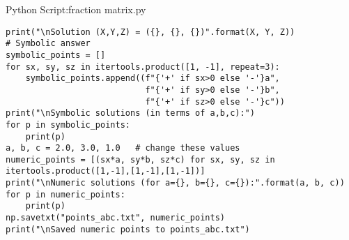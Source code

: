 \documentclass{beamer}
\numberwithin{equation}{section}
\theoremstyle{remark}
\begin{document}
\begin{frame}[fragile]{Python Script:fraction matrix.py}
\begin{verbatim}
print("\nSolution (X,Y,Z) = ({}, {}, {})".format(X, Y, Z))
# Symbolic answer
symbolic_points = []
for sx, sy, sz in itertools.product([1, -1], repeat=3):
    symbolic_points.append((f"{'+' if sx>0 else '-'}a",
                            f"{'+' if sy>0 else '-'}b",
                            f"{'+' if sz>0 else '-'}c"))
print("\nSymbolic solutions (in terms of a,b,c):")
for p in symbolic_points:
    print(p)
a, b, c = 2.0, 3.0, 1.0   # change these values
numeric_points = [(sx*a, sy*b, sz*c) for sx, sy, sz in itertools.product([1,-1],[1,-1],[1,-1])]
print("\nNumeric solutions (for a={}, b={}, c={}):".format(a, b, c))
for p in numeric_points:
    print(p)
np.savetxt("points_abc.txt", numeric_points)
print("\nSaved numeric points to points_abc.txt")
\end{verbatim}
\end{frame}
\end{document}

